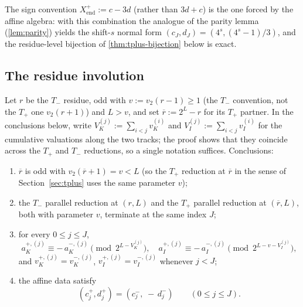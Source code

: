 \documentclass[11pt,reqno]{amsart}
\newcommand{\Tplus}{T_{+}}
\newcommand{\Tminus}{T_{-}}
\newcommand{\Xend}{X_{\mathrm{end}}}
\newcommand{\Vk}{V_{K}}
\newcommand{\Vi}{V_{I}}
\newcommand{\vk}{v_{K}}
\newcommand{\vi}{v_{I}}
\newcommand{\vtwo}{v_{2}}
\begin{document}
\begin{remark}\label{rem:Xplus-sign}
The sign convention $\Xend^{+} := c - 3d$ (rather than $3d + c$) is the
one forced by the affine algebra: with this combination the analogue of
the parity lemma (\cref{lem:parity}) yields the shift-$s$ normal
form $(c_J, d_J) = (4^s, (4^s - 1)/3)$, and the residue-level bijection
of \cref{thm:tplus-bijection} below is exact.
\end{remark}

\subsection{The residue involution}

\begin{lemma}\label{lem:involution-step}
Let $r$ be the $\Tminus$ residue, odd with $v := \vtwo(r-1) \ge 1$ (the
$\Tminus$ convention, not the $\Tplus$ one $\vtwo(r+1)$) and $L > v$, and set
$\overline{r} := 2^L - r$ for its $\Tplus$ partner. In the conclusions below, write
$\Vk^{(j)} := \sum_{i < j} \vk^{(i)}$ and
$\Vi^{(j)} := \sum_{i < j} \vi^{(i)}$ for the cumulative valuations
along the two tracks; the proof shows that they coincide across the
$\Tplus$ and $\Tminus$ reductions, so a single notation suffices.
Conclusions:
\begin{enumerate}[label=(\roman*)]
\item $\overline{r}$ is odd with $\vtwo(\overline{r} + 1) = v < L$
  (so the $\Tplus$ reduction at $\overline{r}$ in the sense of
  Section~\ref{sec:tplus} uses the same parameter $v$);
\item the $\Tminus$ parallel reduction at $(r, L)$ and the $\Tplus$
  parallel reduction at $(\overline{r}, L)$, both with parameter $v$,
  terminate at the same index $J$;
\item for every $0 \le j \le J$,
\begin{equation}\label{eq:invol-residue}
a_K^{+,(j)} \equiv -\, a_K^{-,(j)} \pmod{2^{L - \Vk^{(j)}}},
\quad
a_I^{+,(j)} \equiv -\, a_I^{-,(j)} \pmod{2^{L - v - \Vi^{(j)}}},
\end{equation}
and $\vk^{+,(j)} = \vk^{-,(j)}$, $\vi^{+,(j)} = \vi^{-,(j)}$
whenever $j < J$;
\item the affine data satisfy
\begin{equation}\label{eq:invol-affine}
(c_j^{+}, d_j^{+}) = (c_j^{-},\; -\, d_j^{-}) \qquad (0 \le j \le J).
\end{equation}
\end{enumerate}
\end{lemma}
\end{document}
